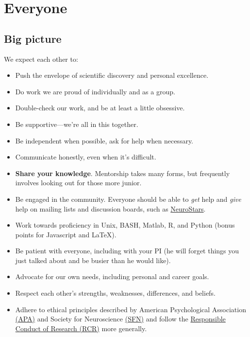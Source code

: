 \documentclass[letterpaper,12pt,oneside]{memoir}
\begin{document}
\section{Everyone}

\subsection{Big picture}

We expect each other to:

\begin{itemize}
\item Push the envelope of scientific discovery and personal excellence. 
\item Do work we are proud of individually and as a group.
\item Double-check our work, and be at least a little obsessive.
\item Be supportive---we're all in this together.
\item Be independent when possible, ask for help when necessary.
\item Communicate honestly, even when it's difficult.
\item \textbf{Share your knowledge}. Mentorship takes many forms, but frequently involves looking out for those more junior.
\item Be engaged in the community. Everyone should be able to \textit{get} help and \textit{give} help on mailing lists and discussion boards, such as \href{https://neurostars.org}{NeuroStars}.
\item Work towards proficiency in Unix, BASH, Matlab, R, and Python (bonus points for Javascript and \LaTeX).
\item Be patient with everyone, including with your PI (he will forget things you just talked about and be busier than he would like).
\item Advocate for our own needs, including personal and career goals.
\item Respect each other's strengths, weaknesses, differences, and beliefs.
\item Adhere to ethical principles described by American Psychological Association \href{https://www.apa.org/ethics/code/}{(APA)} and Society for Neuroscience \href{https://web.sfn.org/sfn/member-center/professional-conduct/sfn-ethics-policy}{(SFN)} and follow the \href{https://ori.hhs.gov/ori-introduction-responsible-conduct-research}{Responsible Conduct of Research (RCR)} more generally. 
\end{itemize}
\end{document}
